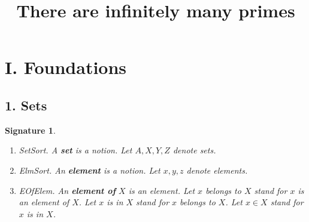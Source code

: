 \newtheorem{signature}{Signature}
\newtheorem{signatures}{Signature}
\newtheorem{axiom}{Axiom}
\newtheorem{axioms}{Axioms}
\newtheorem{definitions}{Definition}
\newtheorem{lemmas}{Lemma}
\newtheorem{signaturep}{Signature}
\newtheorem{axiomp}{Axiom}
\newtheorem{definitionp}{Definition}
\newtheorem{theoremp}{Theorem}
\newtheorem{lemmap}{Lemma}
 
\newcommand{\power}{{\cal P}} 
\newcommand{\preimg}[2]{{#1}^{-1}[#2]} 
\newcommand{\Seq}[2]{\{#1,\dots,#2\}}
\newcommand{\Set}[3]{\{#1_{#2},\dots,#1_{#3}\}}
\newcommand{\Product}[3]{\prod_{i=#2}^{#3}{#1}_i}
\newcommand{\subfunc}[2]{{#1}_{#2}}
\newcommand{\CC}{{\Bbb C}}
\newcommand{\RR}{{\Bbb R}}
\newcommand{\QQ}{{\Bbb Q}}
\newcommand{\ZZ}{{\Bbb Z}} 
\newcommand{\NN}{{\Bbb N}}
\newcommand{\NNplus}{{\Bbb N}^+}

\newcommand{\signatureitem}{\item}
\newcommand{\axiomitem}{\item}
\newcommand{\definitionitem}{\item}
\newcommand{\lemmaitem}{\item}

\title{There are infinitely many primes}
\maketitle
\section{I. Foundations}

\subsection{1. Sets}


\begin{signatures}\\
\begin{enumerate}
\signatureitem SetSort.  A {\bf set} is a notion. Let $A,X,Y,Z$ denote sets.

\signatureitem ElmSort. An {\bf element} is a notion. Let $x,y,z$ denote elements.

\signatureitem EOfElem.  
An {\bf element of} $X$ is an element.
Let $x$ belongs to $X$ stand for $x$ is an element of $X$.
Let $x$ is in $X$ stand for $x$ belongs to $X$.
Let $x \in X$ stand for $x$ is in $X$.
\end{enumerate}
\end{signatures}

